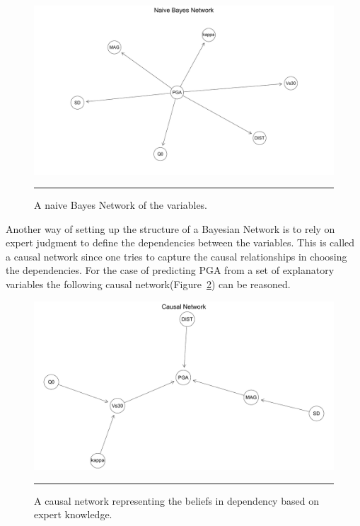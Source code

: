 \begin{figure}[!htpb]
	\centering
		\includegraphics[scale=0.33]{Figures/naive.pdf}
		\rule{35em}{0.5pt}
	\caption[Naive Bayes Network]{A naive Bayes Network of the variables.}
	\label{fig:naive}
\end{figure}
\newpage

Another way of setting up the structure of a Bayesian Network is to rely on expert judgment to define the dependencies between the variables. This is called a causal network since one tries to capture the causal relationships in choosing the dependencies. For the case of predicting PGA from a set of explanatory variables the following causal network(Figure~\ref{fig:causal}) can be reasoned. \\

\begin{figure}[!h]
	\centering
		\includegraphics[scale=0.33]{Figures/causal.pdf}
		\rule{35em}{0.5pt}
	\caption[Causal Network]{A causal network representing the beliefs in dependency based on expert knowledge.}
	\label{fig:causal}
\end{figure}

